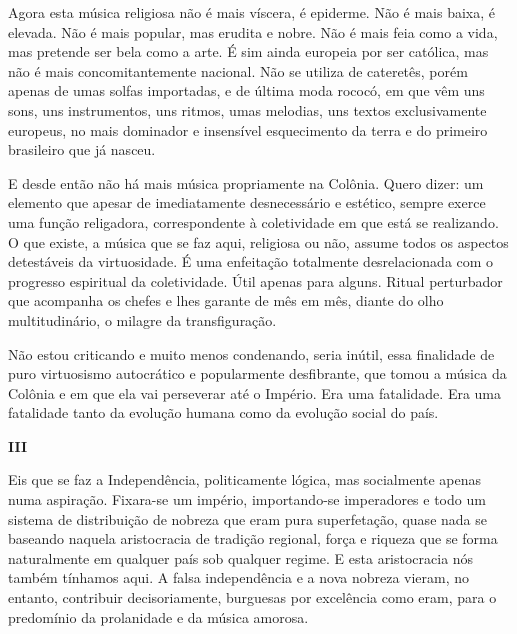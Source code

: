Agora esta música religiosa não é mais víscera, é epiderme. Não é mais
baixa, é elevada. Não é mais popular, mas erudita e nobre. Não é mais
feia como a vida, mas pretende ser bela como a arte. É sim ainda
europeia por ser católica, mas não é mais concomitantemente nacional.
Não se utiliza de cateretês, porém apenas de umas solfas importadas, e
de última moda rococó, em que vêm uns sons, uns instrumentos, uns
ritmos, umas melodias, uns textos exclusivamente europeus, no mais
dominador e insensível esquecimento da terra e do primeiro brasileiro
que já nasceu.

E desde então não há mais música propriamente na Colônia. Quero dizer:
um elemento que apesar de imediatamente desnecessário e estético, sempre
exerce uma função religadora, correspondente à coletividade em que está
se realizando. O que existe, a música que se faz aqui, religiosa ou não,
assume todos os aspectos detestáveis da virtuosidade. É uma enfeitação
totalmente desrelacionada com o progresso espiritual da coletividade.
Útil apenas para alguns. Ritual perturbador que acompanha os chefes e
lhes garante de mês em mês, diante do olho multitudinário, o milagre da
transfiguração.

Não estou criticando e muito menos condenando, seria inútil, essa
finalidade de puro virtuosismo autocrático e popularmente desfibrante,
que tomou a música da Colônia e em que ela vai perseverar até o Império.
Era uma fatalidade. Era uma fatalidade tanto da evolução humana como da
evolução social do país.

\textbf{III}

Eis que se faz a Independência, politicamente lógica, mas socialmente
apenas numa aspiração. Fixara-se um império, importando-se imperadores e
todo um sistema de distribuição de nobreza que eram pura superfetação,
quase nada se baseando naquela aristocracia de tradição regional, força
e riqueza que se forma naturalmente em qualquer país sob qualquer
regime. E esta aristocracia nós também tínhamos aqui. A falsa
independência e a nova nobreza vieram, no entanto, contribuir
decisoriamente, burguesas por excelência como eram, para o predomínio da
prolanidade e da música amorosa.

